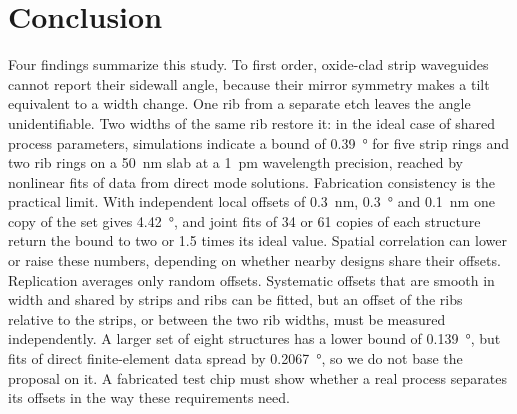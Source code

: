 \section{Conclusion}
\label{sec:conclusion}

Four findings summarize this study. To first order, oxide-clad strip waveguides cannot report their sidewall angle,
because their mirror symmetry makes a tilt equivalent to a width change. One rib from a separate etch leaves the angle
unidentifiable. Two widths of the same rib restore it: in the ideal case of shared process parameters, simulations
indicate a bound of \qty{0.39}{\degree} for five strip rings and two rib rings on a \qty{50}{nm} slab at a \qty{1}{pm}
wavelength precision, reached by nonlinear fits of data from direct mode solutions. Fabrication consistency is the
practical limit. With independent local offsets of \qty{0.3}{nm}, \qty{0.3}{\degree} and \qty{0.1}{nm} one copy of the
set gives \qty{4.42}{\degree}, and joint fits of 34 or 61 copies of each structure return the bound to two or 1.5 times
its ideal value. Spatial correlation can lower or raise these numbers, depending on whether nearby designs share their
offsets. Replication averages only random offsets. Systematic offsets that are smooth in width and shared by strips and
ribs can be fitted, but an offset of the ribs relative to the strips, or between the two rib widths, must be measured
independently. A larger set of eight structures has a lower bound of \qty{0.139}{\degree}, but fits of direct
finite-element data spread by \qty{0.2067}{\degree}, so we do not base the proposal on it. A fabricated test chip must
show whether a real process separates its offsets in the way these requirements need.
